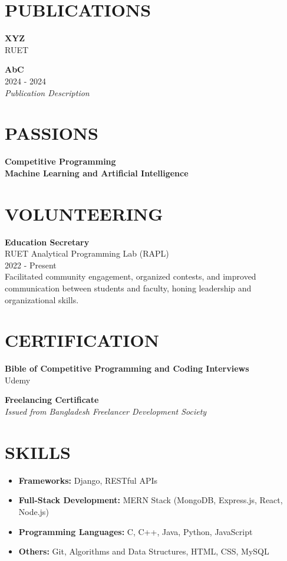 \documentclass[a4paper,10pt]{article}
\begin{document}
\begin{multicols}{2}
\section*{PUBLICATIONS}
\textbf{XYZ} \\
RUET

\textbf{AbC} \\
2024 - 2024 \\
\textit{Publication Description}

\section*{PASSIONS}
\textbf{Competitive Programming} \\

\textbf{Machine Learning and Artificial Intelligence} \\

\section*{VOLUNTEERING}
\textbf{Education Secretary} \\
RUET Analytical Programming Lab (RAPL) \\
2022 - Present \\
Facilitated community engagement, organized contests, and improved communication between students and faculty, honing leadership and organizational skills.

\section*{CERTIFICATION}
\textbf{Bible of Competitive Programming and Coding Interviews} \\
Udemy

\textbf{Freelancing Certificate} \\
\textit{Issued from Bangladesh Freelancer Development Society}

\section*{SKILLS}
\begin{itemize}[leftmargin=*]
    \item \textbf{Frameworks:} Django, RESTful APIs
    \item \textbf{Full-Stack Development:} MERN Stack (MongoDB, Express.js, React, Node.js)
    \item \textbf{Programming Languages:} C, C++, Java, Python, JavaScript
    \item \textbf{Others:} Git, Algorithms and Data Structures, HTML, CSS, MySQL
\end{itemize}


\end{multicols}
\end{document}
